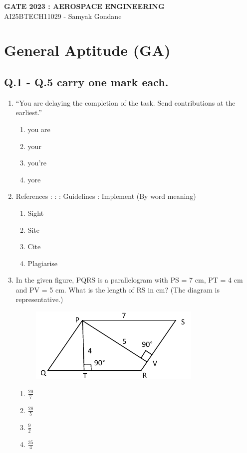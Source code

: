 \documentclass{article}
\begin{document}
\begin{center}
\large
    \textbf{GATE 2023 : AEROSPACE ENGINEERING}\\
    AI25BTECH11029 - Samyak Gondane
\end{center}

\section*{General Aptitude (GA)}
\subsection*{Q.1 - Q.5 carry one mark each.}

\begin{enumerate}[leftmargin=*]
\item ``You are delaying the completion of the task. Send \underline{\hspace{1.5cm}} contributions at the earliest.''
\begin{multicols}{4}
\begin{enumerate}
\item you are
\item your
\item you're
\item yore
\end{enumerate}
\end{multicols}

\item References : \underline{\hspace{1.5cm}} : : Guidelines : Implement (By word meaning)
\begin{multicols}{4}
\begin{enumerate}
\item Sight
\item Site
\item Cite
\item Plagiarise
\end{enumerate}
\end{multicols}

\item In the given figure, PQRS is a parallelogram with PS = 7 cm, PT = 4 cm and PV = 5 cm. What is the length of RS in cm? (The diagram is representative.)
\begin{figure}[H]
    \centering
    \includegraphics[width=0.3\linewidth]{figs/q3.png}
    \caption{}
    \label{fig:q3}
\end{figure}
\begin{multicols}{4}
\begin{enumerate}
\item $\frac{20}{7}$
\item $\frac{28}{5}$
\item $\frac{9}{2}$
\item $\frac{35}{4}$
\end{enumerate}
\end{multicols}


\end{enumerate}
\end{document}

